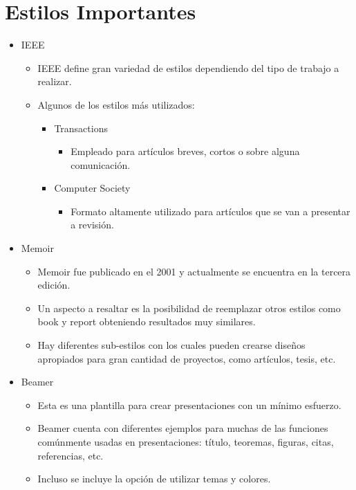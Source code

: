 \documentclass[10pt,journal,compsoc]{IEEEtran}
\begin{document}
\section{Estilos Importantes}
\begin{itemize}
	\item IEEE
	\begin{itemize}
		\item IEEE define gran variedad de estilos dependiendo del tipo de trabajo a realizar.
		\item Algunos de los estilos m\'as utilizados:
		\begin{itemize}
			\item Transactions 
			\begin{itemize}
				\item Empleado para art\'iculos breves, cortos o sobre alguna comunicaci\'on.
			\end{itemize}
			\item Computer Society
			\begin{itemize}
				\item Formato altamente utilizado para art\'iculos que se van a presentar a revisi\'on.
			\end{itemize}
		\end{itemize}
	\end{itemize}
	\item Memoir
	\begin{itemize}
		\item Memoir fue publicado en el 2001 y actualmente se encuentra en la tercera edici\'on.
		\item Un aspecto a resaltar es la posibilidad de reemplazar otros estilos como book y report obteniendo resultados muy similares.
		\item Hay diferentes sub-estilos con los cuales pueden crearse diseños apropiados para gran cantidad de proyectos, como art\'iculos, tesis, etc.
	\end{itemize}
	\item Beamer
	\begin{itemize}
		\item Esta es una plantilla para crear presentaciones con un m\'inimo esfuerzo.
		\item Beamer cuenta con diferentes ejemplos para muchas de las funciones com\'unmente usadas en presentaciones: t\'itulo, teoremas, figuras, citas, referencias, etc.
		\item Incluso se incluye la opci\'on de utilizar temas y colores.
	\end{itemize}
\end{itemize}
\end{document}
